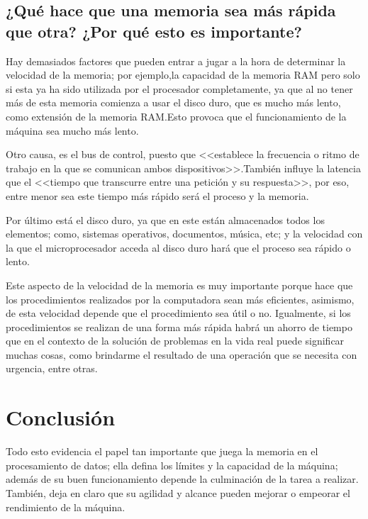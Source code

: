 \documentclass{article}
\begin{document}
\subsection{¿Qué hace que una memoria sea más rápida que otra? ¿Por qué esto es importante?}\par
Hay demasiados factores que pueden entrar a jugar a la hora de determinar la velocidad de la memoria; por ejemplo,la capacidad de la memoria RAM pero solo si esta ya ha sido utilizada por el procesador completamente, ya que al no tener más de esta memoria comienza a usar el disco duro, que es mucho más lento, como extensión de la memoria RAM.Esto provoca que el funcionamiento de la máquina sea mucho más lento.\par
Otro causa, es el bus de control, puesto que <<establece la frecuencia o ritmo de trabajo en la que se comunican ambos dispositivos>>\cite{Salazar}.También influye la latencia que el <<tiempo que transcurre entre una petición y su respuesta>>\cite{breixobaloca}, por eso, entre menor sea este tiempo más rápido será el proceso y la memoria.\par
Por último está el disco duro, ya que en este están almacenados todos los elementos; como, sistemas operativos, documentos, música, etc; y la velocidad con la que el microprocesador acceda al disco duro hará que el proceso sea rápido o lento.\cite{El_Comercio}\par
Este aspecto de la velocidad de la memoria es muy importante porque hace que los procedimientos realizados por la computadora sean más eficientes, asimismo, de esta velocidad depende que el procedimiento sea útil o no. Igualmente, si los procedimientos se realizan de una forma más rápida habrá un ahorro de tiempo que en el contexto de la solución de problemas en la vida real puede significar muchas cosas, como brindarme el resultado de una operación que se necesita con urgencia, entre otras.\par

\section{Conclusión} \label{conclulsion}
Todo esto evidencia el papel tan importante que juega la memoria en el procesamiento de datos; ella defina los límites y la capacidad de la máquina; además de su buen funcionamiento depende la culminación de la tarea a realizar. También, deja en claro que su agilidad y alcance pueden mejorar o empeorar el rendimiento de la máquina.



\end{document}
